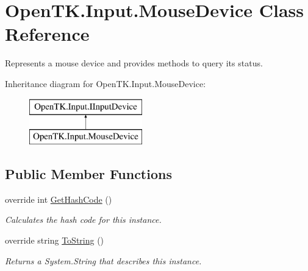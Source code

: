 \hypertarget{class_open_t_k_1_1_input_1_1_mouse_device}{\section{Open\-T\-K.\-Input.\-Mouse\-Device Class Reference}
\label{class_open_t_k_1_1_input_1_1_mouse_device}
}


Represents a mouse device and provides methods to query its status.  


Inheritance diagram for Open\-T\-K.\-Input.\-Mouse\-Device\-:\begin{figure}[H]
\begin{center}
\leavevmode
\includegraphics[height=2.000000cm]{class_open_t_k_1_1_input_1_1_mouse_device}
\end{center}
\end{figure}
\subsection*{Public Member Functions}
\begin{DoxyCompactItemize}
\item 
override int \hyperlink{class_open_t_k_1_1_input_1_1_mouse_device_a58acad12c9337d1ace173b6131f1ff95}{Get\-Hash\-Code} ()
\begin{DoxyCompactList}\small\item\em Calculates the hash code for this instance. \end{DoxyCompactList}\item 
override string \hyperlink{class_open_t_k_1_1_input_1_1_mouse_device_a347569de00bc02fc3392f156f3fb4faa}{To\-String} ()
\begin{DoxyCompactList}\small\item\em Returns a System.\-String that describes this instance. \end{DoxyCompactList}\end{DoxyCompactItemize}

